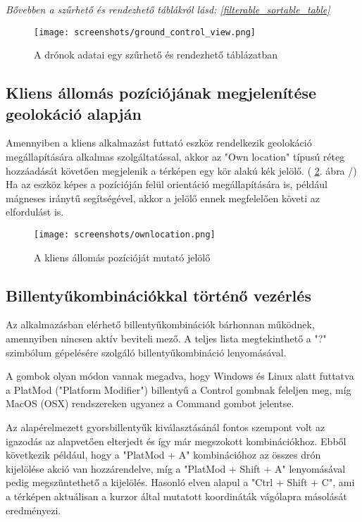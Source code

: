 \textit{
  Bővebben a szűrhető és rendezhető táblákról lásd:
  \ref{filterable_sortable_table}
}

\begin{figure}[H]
  \texttt{[image: screenshots/ground\_control\_view.png]}
  \caption{A drónok adatai egy szűrhető és rendezhető táblázatban}
  \label{fig:ground_control_view}
\end{figure}

\subsection{Kliens állomás pozíciójának megjelenítése geolokáció alapján}

Amennyiben a kliens alkalmazást futtató eszköz rendelkezik geolokáció
megállapítására alkalmas szolgáltatással, akkor az "Own location" típusú réteg
hozzáadását követően megjelenik a térképen egy kör alakú kék jelölő.
( \ref{fig:ownlocation}. ábra /) Ha az eszköz képes a pozícióján felül
orientáció megállapítására is, például mágneses iránytű segítségével, akkor a
jelölő ennek megfelelően követi az elfordulást is.

\begin{figure}[H]
  \texttt{[image: screenshots/ownlocation.png]}
  \caption{A kliens állomás pozícióját mutató jelölő}
  \label{fig:ownlocation}
\end{figure}

\newpage

\subsection{Billentyűkombinációkkal történő vezérlés}

Az alkalmazásban elérhető billentyűkombinációk bárhonnan működnek, amennyiben
nincsen aktív beviteli mező. A teljes lista megtekinthető a "?" szimbólum
gépelésére szolgáló billentyűkombináció lenyomásával.

A gombok olyan módon vannak megadva, hogy Windows és Linux alatt futtatva a
PlatMod ("Platform Modifier") billentyű a Control gombnak feleljen meg, míg
MacOS (OSX) rendszereken ugyanez a Command gombot jelentse.

Az alapérelmezett gyorsbillentyűk kiválasztásánál fontos szempont volt az
igazodás az alapvetően elterjedt és így már megszokott kombinációkhoz. Ebből
következik például, hogy a "PlatMod + A" kombinációhoz az összes drón
kijelölése akció van hozzárendelve, míg a "PlatMod + Shift + A" lenyomásával
pedig megszüntethető a kijelölés. Hasonló elven alapul a "Ctrl + Shift + C", ami
a térképen aktuálisan a kurzor által mutatott koordináták vágólapra másolását
eredményezi.

